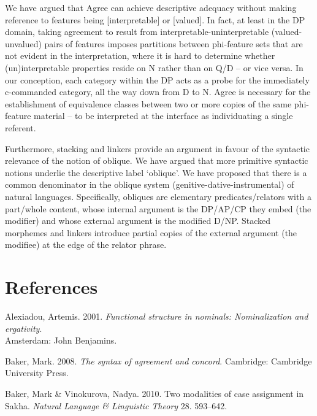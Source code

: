 \documentclass[output=paper]{langsci/langscibook}
\begin{document}
  We have argued that Agree can achieve descriptive adequacy without making reference to features being [interpretable] or [valued]. In fact, at least in the DP domain, taking agreement to result from interpretable-uninterpretable (valued-unvalued) pairs of features imposes partitions between phi-feature sets that are not evident in the interpretation, where it is hard to determine whether (un)interpretable properties reside on N rather than on Q/D – or vice versa. In our conception, each category within the DP acts as a probe for the immediately c-commanded category, all the way down from D to N. Agree is necessary for the establishment of equivalence classes between two or more copies of the same phi-feature material – to be interpreted at the interface as individuating a single referent. 

Furthermore, stacking and linkers provide an argument in favour of the syntactic relevance of the notion of oblique. We have argued that more primitive syntactic notions underlie the descriptive label ‘oblique’. We have proposed that there is a common denominator in the oblique system (genitive-dative-instrumental) of natural languages. Specifically, obliques are elementary predicates/relators with a part/whole content, whose internal argument is the DP/AP/CP they embed (the modifier) and whose external argument is the modified D/NP. Stacked morphemes and linkers introduce partial copies of the external argument (the modifiee) at the edge of the relator phrase. 

\section{ References}

\begin{styleSfondomedioiColorexi}
Alexiadou, Artemis. 2001. \textit{Functional structure in nominals: Nominalization and ergativity}.\\
Amsterdam: John Benjamins.
\end{styleSfondomedioiColorexi}

\begin{styleSfondomedioiColorexi}
Baker, Mark. 2008. \textit{The syntax of agreement and concord}. Cambridge: Cambridge University Press.
\end{styleSfondomedioiColorexi}

\begin{styleSfondomedioiColorexi}
Baker, Mark \& Vinokurova, Nadya. 2010. Two modalities of case assignment in Sakha. \textit{Natural Language \& Linguistic Theory} 28. 593–642.
\end{styleSfondomedioiColorexi}
\end{document}

